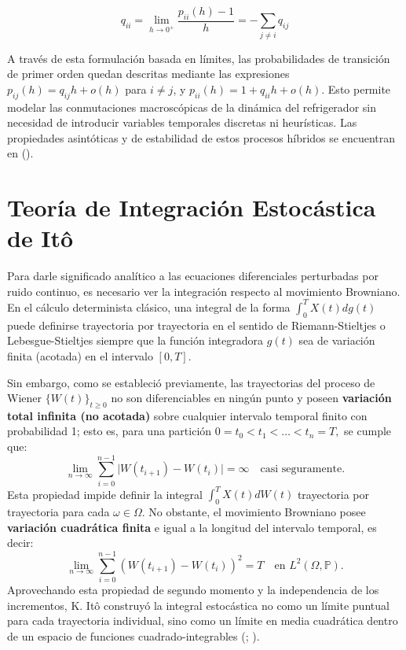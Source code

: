 \documentclass[
  spanish,
  letterpaper,
  DIV=11,
  numbers=noendperiod]{scrreprt}
\theoremstyle{plain}
\theoremstyle{plain}
\theoremstyle{plain}
\theoremstyle{definition}
\theoremstyle{remark}
\begin{document}
\[
q_{ii} = \lim_{h \to 0^+} \frac{p_{ii}(h) - 1}{h} = -\sum_{j \neq i} q_{ij}
\]

A través de esta formulación basada en límites, las probabilidades de
transición de primer orden quedan descritas mediante las expresiones
\(p_{ij}(h) = q_{ij}h + o(h)\) para \(i \neq j\), y
\(p_{ii}(h) = 1 + q_{ii}h + o(h)\). Esto permite modelar las
conmutaciones macroscópicas de la dinámica del refrigerador sin
necesidad de introducir variables temporales discretas ni heurísticas.
Las propiedades asintóticas y de estabilidad de estos procesos híbridos
se encuentran en ().

\section{Teoría de Integración Estocástica de
Itô}\label{teoruxeda-de-integraciuxf3n-estocuxe1stica-de-ituxf4}

Para darle significado analítico a las ecuaciones diferenciales
perturbadas por ruido continuo, es necesario ver la integración respecto
al movimiento Browniano. En el cálculo determinista clásico, una
integral de la forma \(\displaystyle \int_0^T X(t) dg(t)\) puede
definirse trayectoria por trayectoria en el sentido de Riemann-Stieltjes
o Lebesgue-Stieltjes siempre que la función integradora \(g(t)\) sea de
variación finita (acotada) en el intervalo \([0, T]\).

Sin embargo, como se estableció previamente, las trayectorias del
proceso de Wiener \(\{W(t)\}_{t \ge 0}\) no son diferenciables en ningún
punto y poseen \textbf{variación total infinita (no acotada)} sobre
cualquier intervalo temporal finito con probabilidad 1; esto es, para
una partición \(0 = t_0 < t_1 < \dots < t_n = T,\) se cumple que: \[
\lim_{n \to \infty} \sum_{i=0}^{n-1} \vert W(t_{i+1}) - W(t_i) \vert = \infty \quad \text{casi seguramente.}
\] Esta propiedad impide definir la integral
\(\displaystyle \int_0^T X(t) dW(t)\) trayectoria por trayectoria para
cada \(\omega \in \Omega\). No obstante, el movimiento Browniano posee
\textbf{variación cuadrática finita} e igual a la longitud del intervalo
temporal, es decir: \[
\lim_{n \to \infty} \sum_{i=0}^{n-1} \left( W(t_{i+1}) - W(t_i) \right)^2 = T \quad \text{en } L^2(\Omega, \mathbb{P}).
\] Aprovechando esta propiedad de segundo momento y la independencia de
los incrementos, K. Itô construyó la integral estocástica no como un
límite puntual para cada trayectoria individual, sino como un límite en
media cuadrática dentro de un espacio de funciones cuadrado-integrables
(;
).
\end{document}
